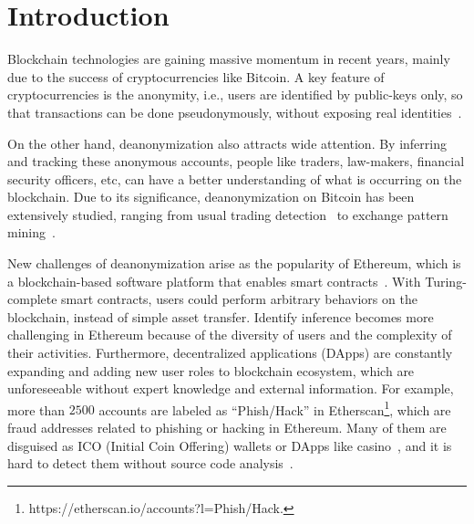 \section{Introduction}
Blockchain technologies are gaining massive momentum in recent years, mainly due to the success of cryptocurrencies like Bitcoin. A key feature of cryptocurrencies is the anonymity, i.e., users are identified by public-keys only, so that transactions can be done pseudonymously, without exposing real identities~\cite{reid2013analysis}.

On the other hand, deanonymization also attracts wide attention. By inferring and tracking these anonymous accounts, people like traders, law-makers, financial security officers, etc, can have a better understanding of what is occurring on the blockchain. Due to its significance, deanonymization on Bitcoin has been extensively studied, ranging from usual trading detection~\cite{maesa2016analysis} to exchange pattern mining~\cite{ranshous2017exchange}.
 
 

New challenges of deanonymization arise as the popularity of Ethereum, which is a blockchain-based software platform that enables smart contracts~\cite{buterin2013ethereum}.
With Turing-complete smart contracts, users could perform arbitrary behaviors on the blockchain, instead of simple asset transfer. 
Identify inference becomes more challenging in Ethereum because of the diversity of users and the complexity of their activities. Furthermore, decentralized applications (DApps) are constantly expanding and adding new user roles to blockchain ecosystem, which are unforeseeable without expert knowledge and external information.
For example, more than $2500$ accounts are labeled as ``Phish/Hack'' in Etherscan\footnote{https://etherscan.io/accounts?l=Phish/Hack.}, which are fraud addresses related to phishing or hacking in Ethereum. Many of them are disguised as ICO (Initial Coin Offering) wallets or DApps like casino~\cite{cerchiello2018icos}, and it is hard to detect them without source code analysis~\cite{jiang2018contractfuzzer}. 

